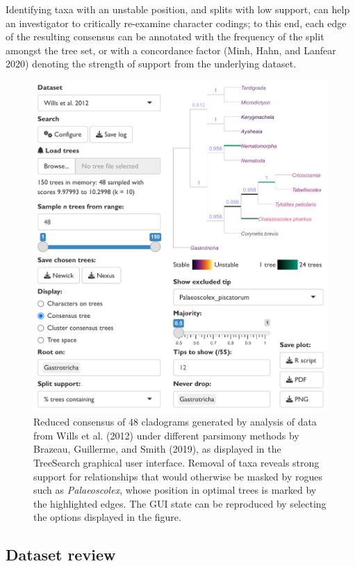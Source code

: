 Identifying taxa with an unstable position, and splits with low support, can
help an investigator to critically re-examine character codings; to this end,
each edge of the resulting consensus can be annotated with the frequency of the
split amongst the tree set, or with a concordance factor (Minh, Hahn, and Lanfear 2020) denoting
the strength of support from the underlying dataset.

\begin{figure}
\includegraphics[width=1\linewidth]{WillsCons} \caption{Reduced consensus of 48 cladograms generated by analysis of data from Wills et al. (2012) under different parsimony methods by Brazeau, Guillerme, and Smith (2019), as displayed in the TreeSearch graphical user interface. Removal of taxa reveals strong support for relationships that would otherwise be masked by rogues such as \emph{Palaeoscolex}, whose position in optimal trees is marked by the highlighted edges. The GUI state can be reproduced by selecting the options displayed in the figure.}\label{fig:rogueplot-latex}
\end{figure}



\hypertarget{dataset-review}{%
\subsection{Dataset review}\label{dataset-review}}

